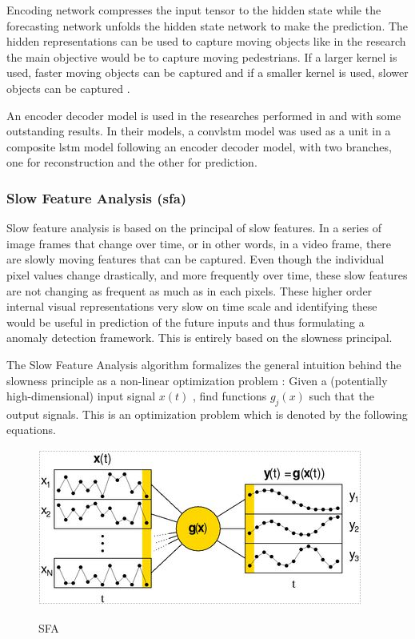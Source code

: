 \documentclass[a4paper,12pt]{report}
\begin{document}
\begin{itemize}
Encoding network compresses the input tensor to the hidden state while the forecasting network unfolds the hidden state network to make the prediction. The hidden representations can be used to capture moving objects like in the research the main objective would be to capture moving pedestrians. If a larger kernel is used, faster moving objects can be captured and if a smaller kernel is used, slower objects can be captured \cite{51}.

An encoder decoder model is used in the researches performed in \cite{52} and \cite{53} with some outstanding results. In their models, a \gls{convlstm} model was used as a unit in a composite \gls{lstm} model following an encoder decoder model, with two branches, one for reconstruction and the other for prediction. 


\subsubsection{Slow Feature Analysis (\gls{sfa})}
Slow feature analysis is based on the principal of slow features. In a series of image frames that change over time, or in other words, in a video frame, there are slowly moving features that can be captured. Even though the individual pixel values change drastically, and more frequently over time, these slow features are not changing as  frequent as much as in each pixels. These higher order internal visual representations very slow on time scale and identifying these would be useful in prediction of the future inputs and thus formulating a anomaly detection framework. This is entirely based on the slowness principal. 

The Slow Feature Analysis algorithm formalizes the general intuition behind the slowness principle as a non-linear optimization problem : Given a (potentially high-dimensional) input signal $x(t)$ , find functions $g_j(x)$ such that the output signals. This is an optimization problem which is denoted by the following equations.

\begin{figure}[H]
\caption{SFA}
\includegraphics [scale=1]{images/SFA.JPG}
\centering
\label{fig:sfa}
\end{figure}



\end{itemize}
\end{document}
